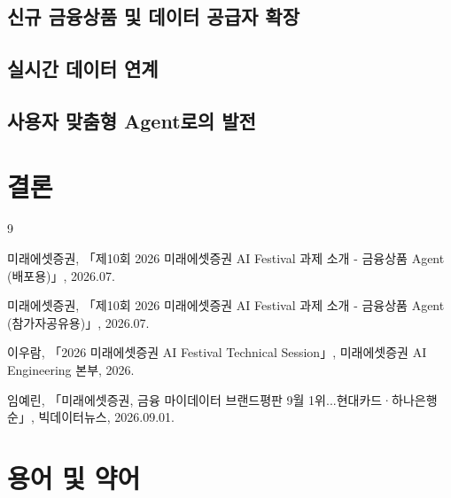\documentclass[11pt,a4paper]{article}
\begin{document}

\subsection{신규 금융상품 및 데이터 공급자 확장}


\subsection{실시간 데이터 연계}


\subsection{사용자 맞춤형 Agent로의 발전}


\section{결론}



\begin{thebibliography}{9}

미래에셋증권,
「제10회 2026 미래에셋증권 AI Festival 과제 소개 - 금융상품 Agent (배포용)」,
2026.07.

미래에셋증권,
「제10회 2026 미래에셋증권 AI Festival 과제 소개 - 금융상품 Agent (참가자공유용)」,
2026.07.

이우람,
「2026 미래에셋증권 AI Festival Technical Session」,
미래에셋증권 AI Engineering 본부,
2026.

임예린,
「미래에셋증권, 금융 마이데이터 브랜드평판 9월 1위...현대카드·하나은행 순」,
빅데이터뉴스,
2026.09.01.

\end{thebibliography}

\appendix

\section{용어 및 약어}
\end{document}
